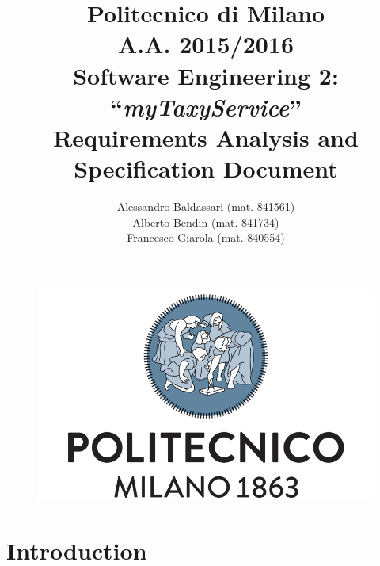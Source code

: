 \documentclass[a4paper,11pt]{report} %
\title{Politecnico di Milano\\A.A. 2015/2016\\Software Engineering 2: ``{\em myTaxyService}'' \\ \bigskip \textbf{R}equirements \textbf{A}nalysis and \textbf{S}pecification \textbf{D}ocument}
\author{Alessandro Baldassari (mat. 841561) \\ Alberto Bendin (mat. 841734) \\ Francesco Giarola (mat. 840554)}
\begin{document}
	
	
	\begin{figure}[t]
		\centering
		\includegraphics[width=1\linewidth]{"Pictures/polimi-logo"}
		\label{fig:polimi-logo}
	\end{figure}
	
	\maketitle
		
	
	\thispagestyle{empty}
	\clearpage\mbox{}\clearpage
	
	
	
	\renewcommand*\thesection{\arabic{section}}
	\renewcommand*\thesubsection{\arabic{section}.\arabic{subsection}}
	\renewcommand*\thesubsubsection{%
	\arabic{section}.\arabic{subsection}.\arabic{subsubsection}%
	}
	\setcounter{secnumdepth}{4}
	\setcounter{tocdepth}{4}
		
	
	\tableofcontents
	\newpage
	
	
	
	\section{Introduction}
	
\end{document}
